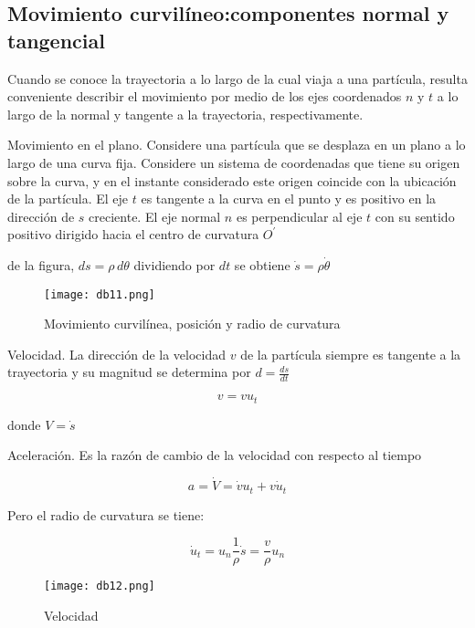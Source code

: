 \subsection{Movimiento curvilíneo:componentes normal y tangencial}

Cuando se conoce la trayectoria a lo largo de la cual viaja a una partícula, resulta conveniente describir el movimiento por medio de los ejes coordenados $n$ y $t$ a lo largo de la normal y tangente a la trayectoria, respectivamente.

Movimiento en el plano. Considere una partícula que se desplaza en un plano a lo largo de una curva fija. Considere un sistema de coordenadas que tiene su origen sobre la curva, y en el instante considerado este origen coincide con la ubicación de la partícula. El eje $t$ es tangente a la curva en el punto y es positivo en la dirección de $s$ creciente. El eje normal $n$ es perpendicular al eje $t$ con su sentido positivo dirigido hacia el centro de curvatura $O^{\prime}$

de la figura, $ds=\rho \,d\theta$ dividiendo por $dt$ se obtiene $\dot{s}=\rho\dot{\theta}$

\begin{wrapfigure}{l}{0.25\textwidth}
  \centerline{\texttt{[image: db11.png]}}
  \caption{Movimiento curvilínea, posición y radio de curvatura}
  \label{db11}
\end{wrapfigure}


Velocidad. La dirección de la velocidad $v$ de la partícula siempre es tangente a la trayectoria y su magnitud se determina por $d=\frac{ds}{dt}$

\begin{equation}
    v=vu_t
\end{equation}

donde $V=\dot{s}$

Aceleración. Es la razón de cambio de la velocidad con respecto al tiempo

\begin{equation}
    a=\dot{V}=\dot{v}u_t+v\dot{u}_t
\end{equation}

Pero el radio de curvatura se tiene: 

\begin{equation}
    \dot{u}_t=u_n\frac{1}{\rho}\dot{s}=\frac{v}{\rho}u_n
\end{equation}

\begin{figure}[h!]
  \centerline{\texttt{[image: db12.png]}}
  \caption{Velocidad}
  \label{db12}
\end{figure}

